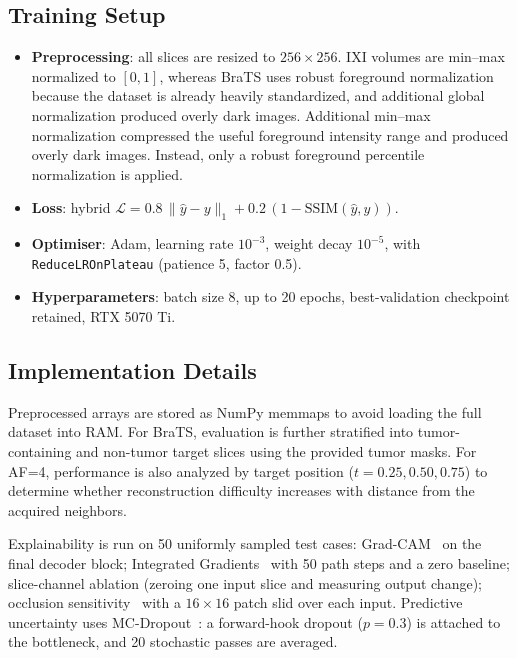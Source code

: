 \documentclass{article}
\begin{document}
\subsection{Training Setup}
\begin{itemize}
    \itemsep0.2em
        \item \textbf{Preprocessing}: all slices are resized to \(256\times256\). IXI volumes are min--max normalized to \([0,1]\), whereas BraTS uses robust foreground normalization because the dataset is already heavily standardized, and additional global normalization produced overly dark images.
        Additional min--max normalization compressed the useful foreground intensity range and produced overly dark images. Instead, only a robust foreground percentile normalization is applied.
    \item \textbf{Loss}: hybrid
          \(\mathcal{L}=0.8\,\lVert\hat{y}-y\rVert_{1}+0.2\,(1-\mathrm{SSIM}(\hat{y},y))\).
    \item \textbf{Optimiser}: Adam, learning rate \(10^{-3}\), weight decay
          \(10^{-5}\), with \texttt{ReduceLROnPlateau} (patience 5, factor 0.5).
    \item \textbf{Hyperparameters}: batch size 8, up to 20 epochs, best-validation checkpoint retained, RTX 5070 Ti.
\end{itemize}

\subsection{Implementation Details}
Preprocessed arrays are stored as NumPy memmaps to avoid loading the full dataset into RAM. For BraTS, evaluation is further stratified into tumor-containing and non-tumor target slices using the provided tumor masks. For AF=4, performance is also analyzed by target position (\(t=0.25, 0.50, 0.75\)) to determine whether reconstruction difficulty increases with distance from the acquired neighbors. 

Explainability is run on 50 uniformly sampled test cases: Grad-CAM~\cite{selvaraju2017gradcam} on the final decoder block; Integrated Gradients~\cite{sundararajan2017ig} with 50 path steps and a zero baseline; slice-channel ablation (zeroing one input slice and measuring output change); occlusion sensitivity~\cite{zeiler2014visualizing} with a $16{\times}16$ patch slid over each input. Predictive uncertainty uses MC-Dropout~\cite{gal2016dropout}: a forward-hook dropout ($p{=}0.3$) is attached to the bottleneck, and 20 stochastic passes are averaged.
\end{document}
